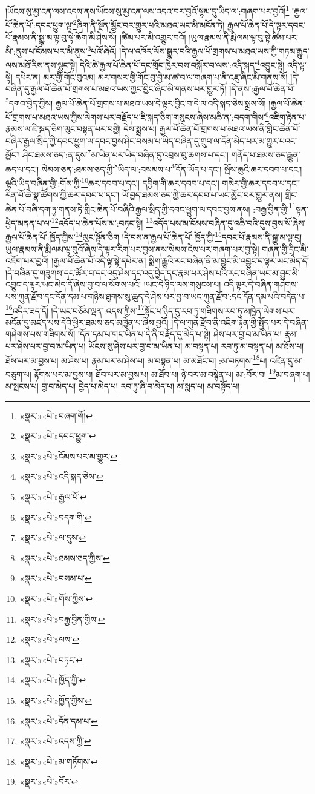 །ཡོངས་སུ་མྱ་ངན་ལས་འདས་ནས་ཡོངས་སུ་མྱ་ངན་ལས་འདའ་བར་བྱའོ་སྙམ་དུ་ཡིད་ལ་:གཞག་པར་བྱའོ།\footnote{«སྣར་»«པེ་»བཞག་གོ།} །རྒྱལ་པོ་ཆེན་པོ་:དབང་ཕྱུག་ལྟ་\footnote{«སྣར་»«པེ་»དབང་ཕྱུག་}ཞིག་ནི་སྔོན་མྱོང་བར་གྱུར་པའི་མཐའ་ཡང་མི་མངོན་ཏེ། རྒྱལ་པོ་ཆེན་པོ་དེ་ལྟར་དབང་པོ་རྣམས་ནི་སྒྱུ་མ་ལྟ་བུ་སྟེ་ཆོག་མི་ཤེས་སོ། །ཚིམ་པར་མི་འགྱུར་བའོ། །ཡུལ་རྣམས་ནི་རྨི་ལམ་ལྟ་བུ་སྟེ་ཚིམ་པར་མི་:ནུས་པ་ངོམས་པར་མི་ནུས་\footnote{«སྣར་»«པེ་»ངོམས་པར་མ་གྱུར་}པའོ་ཞེའོ། །དེ་ལ་འཁོར་ལོས་སྒྱུར་བའི་རྒྱལ་པོ་གྲགས་པ་མཐའ་ཡས་ཀྱི་གཏམ་རྒྱུད་ལས་མཐོ་རིས་ནས་ལྷུང་སྟེ། དེའི་ཚེ་རྒྱལ་པོ་ཆེན་པོ་དང་གྲོང་ཁྱེར་བས་བསྐོར་བ་ལས་:འདི་སྐད་\footnote{«སྣར་»«པེ་»འདི་སྐད་ཅེས་}འབྱུང་སྟེ། འདི་ལྟ་སྟེ། དཔེར་ན། མར་གྱི་གོང་བུའམ། མར་གསར་གྱི་གོང་བུ་བྱེ་མ་ཚ་བ་ལ་གཞག་པ་ནི་འཇུ་ཞིང་མི་གནས་སོ། །དེ་བཞིན་དུ་རྒྱལ་པོ་ཆེན་པོ་གྲགས་པ་མཐའ་ཡས་ཀྱང་བྱིང་ཞིང་མི་གནས་པར་གྱུར་ཏོ། །དེ་ནས་:རྒྱལ་པོ་ཆེན་པོ་\footnote{«སྣར་»«པེ་»རྒྱལ་པོ་}དགའ་བྱེད་ཀྱིས། རྒྱལ་པོ་ཆེན་པོ་གྲགས་པ་མཐའ་ཡས་དེ་ལྟར་བྱིང་བ་དེ་ལ་འདི་སྐད་ཅེས་སྨྲས་སོ། །རྒྱལ་པོ་ཆེན་པོ་གྲགས་པ་མཐའ་ཡས་ཀྱིས་ལེགས་པར་བརྗོད་པ་ཇི་སྐད་ཅིག་གསུངས་ཞེས་མཆི་ན་:བདག་གིས་\footnote{«སྣར་»«པེ་»བདག་གི་}འཇིག་རྟེན་པ་རྣམས་ལ་ཇི་སྐད་ཅིག་ལུང་བསྟན་པར་བགྱི། དེས་སྨྲས་པ། རྒྱལ་པོ་ཆེན་པོ་གྲགས་པ་མཐའ་ཡས་ནི་གླིང་ཆེན་པོ་བཞིར་རྒྱལ་སྲིད་ཀྱི་དབང་ཕྱུག་ལ་དབང་བྱས་ཤིང་བསམ་པ་ཡིད་བཞིན་དུ་གྲུབ་ལ་དོན་མེད་པར་མ་གྱུར་པའང་མྱོང་། ཤིང་ཐམས་ཅད་:ན་དུས་\footnote{«སྣར་»«པེ་»ལ་དུས་}མ་ཡིན་པར་ཡིད་བཞིན་དུ་འབྲས་བུ་ཆགས་པ་དང་། གནོད་པ་ཐམས་ཅད་རྒྱུན་ཆད་པ་དང་། སེམས་ཅན་:ཐམས་ཅད་ཀྱི་\footnote{«སྣར་»«པེ་»ཐམས་ཅད་ཀྱིས་}ཡིད་ལ་:བསམས་པ་\footnote{«སྣར་»«པེ་»བསམ་པ་}དོན་ཡོད་པ་དང་། སྤོས་ཆུའི་ཆར་དབབ་པ་དང་། ལྷའི་ཡིད་བཞིན་གྱི་:གོས་ཀྱི་\footnote{«སྣར་»«པེ་»གོས་ཀྱིས་}ཆར་དབབ་པ་དང་། དབྱིག་གི་ཆར་དབབ་པ་དང་། གསེར་གྱི་ཆར་དབབ་པ་དང་། རིན་པོ་ཆེ་སྣ་ཚོགས་ཀྱི་ཆར་དབབ་པ་དང་། ཡོ་བྱད་ཐམས་ཅད་ཀྱི་ཆར་དབབ་པ་ཡང་མྱོང་བར་གྱུར་ནས། གླིང་ཆེན་པོ་བཞི་དག་ཏུ་གནས་ཏེ་གླིང་ཆེན་པོ་བཞིའི་རྒྱལ་སྲིད་ཀྱི་དབང་ཕྱུག་ལ་དབང་བྱས་ནས། :བརྒྱ་བྱིན་གྱི་\footnote{«སྣར་»«པེ་»བརྒྱ་བྱིན་གྱིས་}སྟན་ཕྱེད་མནན་པ་ལ་\footnote{«སྣར་»«པེ་»ལས་}འདོད་པ་ཆེན་པོས་མ་:བཏང་སྟེ། \footnote{«སྣར་»«པེ་»བཏང་}འདོད་པས་མ་ངོམས་བཞིན་དུ་འཆི་བའི་དུས་བྱས་སོ་ཞེས་རྒྱལ་པོ་ཆེན་པོ་:ཁྱོད་ཀྱིས་\footnote{«སྣར་»«པེ་»ཁྱོད་ཀྱི་}ལུང་སྟོན་ཅིག །དེ་བས་ན་རྒྱལ་པོ་ཆེན་པོ་:ཁྱོད་ཀྱི་\footnote{«སྣར་»«པེ་»ཁྱོད་ཀྱིས་}དབང་པོ་རྣམས་ནི་སྒྱུ་མ་ལྟ་བུ། ཡུལ་རྣམས་ནི་རྨི་ལམ་ལྟ་བུའོ་ཞེས་དེ་ལྟར་རིག་པར་བྱས་ནས་སེམས་ངེས་པར་གཞག་པར་བྱ་སྟེ། གཞན་གྱི་དྲིང་མི་འཇོག་པར་བྱའོ། །རྒྱལ་པོ་ཆེན་པོ་འདི་ལྟ་སྟེ་དཔེར་ན། སྨིག་རྒྱུའི་རང་བཞིན་ནི་མ་བྱུང་མི་འབྱུང་ད་ལྟར་ཡང་མེད་དོ། །དེ་བཞིན་དུ་གཟུགས་དང་ཚོར་བ་དང་འདུ་ཤེས་དང་འདུ་བྱེད་དང་རྣམ་པར་ཤེས་པའི་རང་བཞིན་ཡང་མ་བྱུང་མི་འབྱུང་ད་ལྟར་ཡང་མེད་དོ་ཞེས་བྱ་བ་ལ་སོགས་པའོ། །ཡང་དེ་ཉིད་ལས་གསུངས་པ། འདི་ལྟར་དེ་བཞིན་གཤེགས་པས་ཀུན་རྫོབ་དང་དོན་དམ་པ་གཉིས་ཐུགས་སུ་ཆུད་དེ་ཤེས་པར་བྱ་བ་ཡང་ཀུན་རྫོབ་:དང་དོན་དམ་པའི་བདེན་པ་\footnote{«སྣར་»«པེ་»དོན་དམ་པ་}འདིར་ཟད་དོ། །དེ་ཡང་བཅོམ་ལྡན་:འདས་ཀྱིས་\footnote{«སྣར་»«པེ་»འདས་ཀྱི་}སྟོང་པ་ཉིད་དུ་རབ་ཏུ་གཟིགས་རབ་ཏུ་མཁྱེན་ལེགས་པར་མངོན་དུ་མཛད་པས་དེའི་ཕྱིར་ཐམས་ཅད་མཁྱེན་པ་ཞེས་བྱའོ། །དེ་ལ་ཀུན་རྫོབ་ནི་འཇིག་རྟེན་གྱི་སྤྱོད་པར་དེ་བཞིན་གཤེགས་པས་གཟིགས་སོ། །དོན་དམ་པ་གང་ཡིན་པ་དེ་ནི་བརྗོད་དུ་མེད་པ་སྟེ། ཤེས་པར་བྱ་བ་མ་ཡིན་པ། རྣམ་པར་ཤེས་པར་བྱ་བ་མ་ཡིན་པ། ཡོངས་སུ་ཤེས་པར་བྱ་བ་མ་ཡིན་པ། མ་བསྟན་པ། རབ་ཏུ་མ་བསྟན་པ། མ་ཐོས་པ། ཐོས་པར་མ་བྱས་པ། མ་ཤེས་པ། རྣམ་པར་མ་ཤེས་པ། མ་བསྟན་པ། མ་མཐོང་བ། :མ་བཏགས་\footnote{«སྣར་»«པེ་»མ་གཏོགས་}པ། འཛིན་དུ་མ་བཅུག་པ། རྟོགས་པར་མ་བྱས་པ། ཐོབ་པར་མ་བྱས་པ། མ་ཐོབ་པ། ཉེ་བར་མ་བསྙེན་པ། མ་:བོར་བ། \footnote{«སྣར་»«པེ་»བོར་}མ་བཞག་པ། མ་སྤངས་པ། བྱ་བ་མེད་པ། བྱེད་པ་མེད་པ། རབ་ཏུ་ཞི་བ་མེད་པ། མ་སྨད་པ། མ་བསྟོད་པ། 